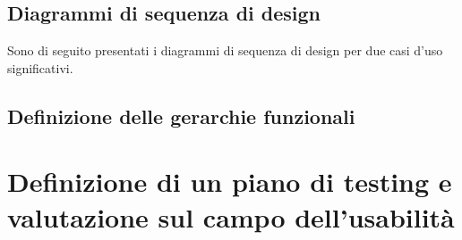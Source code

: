 \documentclass{natourDoc}
\begin{document}
\newpage
\subsection{Diagrammi di sequenza di design}
Sono di seguito presentati i diagrammi di sequenza di design per due casi d'uso significativi.

\newpage
\subsection{Definizione delle gerarchie funzionali}

\newpage
\section{Definizione di un piano di testing e valutazione sul campo dell'usabilità}
\end{document}
